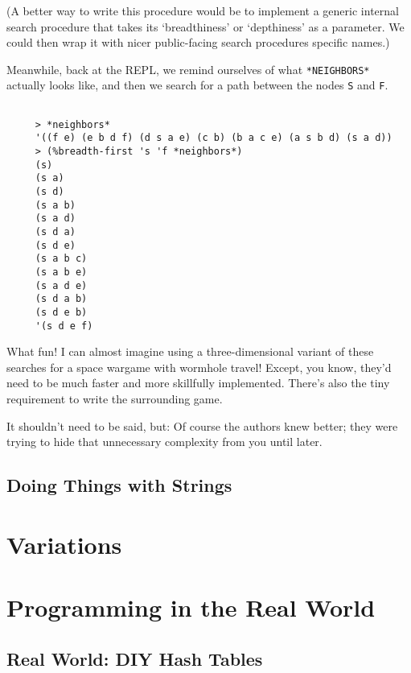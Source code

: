 \documentclass[12pt,openright,draft]{book}
\begin{document}
(A better way to write this procedure would be to implement a generic
internal search procedure that takes its `breadthiness' or
`depthiness' as a parameter.  We could then wrap it with nicer
public-facing search procedures specific names.)

Meanwhile, back at the REPL, we remind ourselves of what
\verb|*NEIGHBORS*| actually looks like, and then we search for a path
between the nodes \verb|S| and \verb|F|.

\begin{verbatim}

     > *neighbors*
     '((f e) (e b d f) (d s a e) (c b) (b a c e) (a s b d) (s a d))
     > (%breadth-first 's 'f *neighbors*)
     (s)
     (s a)
     (s d)
     (s a b)
     (s a d)
     (s d a)
     (s d e)
     (s a b c)
     (s a b e)
     (s a d e)
     (s d a b)
     (s d e b)
     '(s d e f)

\end{verbatim}

What fun!  I can almost imagine using a three-dimensional variant of
these searches for a space wargame with wormhole travel!  Except, you
know, they'd need to be much faster and more skillfully implemented.
There's also the tiny requirement to write the surrounding game.

It shouldn't need to be said, but: Of course the authors knew better;
they were trying to hide that unnecessary complexity from you until
later.

\chapter{Doing Things with Strings}


\part{Variations}


\part{Programming in the Real World}
\chapter{Real World: DIY Hash Tables}
\end{document}
